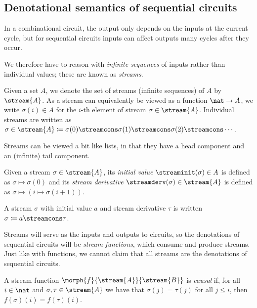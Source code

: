 \documentclass{lmcs}
\begin{document}
\subsection{Denotational semantics of sequential circuits}

In a combinational circuit, the output only depends on the inputs at the current
cycle, but for sequential circuits inputs can affect outputs many cycles after
they occur.

We therefore have to reason with \emph{infinite sequences} of inputs rather than
individual values; these are known as \emph{streams}.

\begin{nota}
    Given a set \(A\), we denote the set of streams (infinite sequences) of
    \(A\) by \(\stream{A}\).
    As a stream can equivalently be viewed as a function \(\nat \to A\), we
    write \(\sigma(i) \in A\) for the \(i\)-th element of stream
    \(\sigma \in \stream{A}\).
    Individual streams are written as \(
    \sigma \in \stream{A}
    \coloneqq
    \sigma(0) \streamcons \sigma(1) \streamcons
    \sigma(2) \streamcons \cdots
    \).
\end{nota}

Streams can be viewed a bit like lists, in that they have a head component and
an (infinite) tail component.

\begin{defi}\label{def:stream-operations}
    Given a stream \(\sigma \in \stream{A}\), its \emph{initial value}
    \(\streaminit(\sigma) \in A\) is defined as \(\sigma \mapsto \sigma(0)\)
    and its \emph{stream derivative} \(\streamderv(\sigma) \in \stream{A}\) is
    defined as \(\sigma \mapsto (i \mapsto \sigma(i+1))\).
\end{defi}

\begin{nota}
    A stream \(\sigma\) with initial value \(a\) and stream derivative
    \(\tau\) is written \(\sigma \coloneqq a \streamcons \tau\).
\end{nota}

Streams will serve as the inputs and outputs to circuits, so the denotations of
sequential circuits will be \emph{stream functions}, which consume and produce
streams.
Just like with functions, we cannot claim that all streams are the
denotations of sequential circuits.

\begin{defi}
    A stream function \(\morph{f}{\stream{A}}{\stream{B}}\) is \emph{causal} if,
    for all \(i \in \nat\) and \(\sigma,\tau \in \stream{A}\) we have that
    \(\sigma(j) = \tau(j)\) for all \(j \leq i\), then
    \(f(\sigma)(i) = f(\tau)(i)\).
\end{defi}
\end{document}
